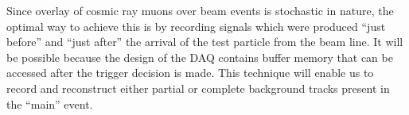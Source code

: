 
Since overlay of cosmic ray muons over beam events is stochastic in nature, the optimal way to achieve this is by recording signals which were produced ``just before'' and ``just after'' the arrival of the test particle from the beam line.  It will be possible because the design of the DAQ contains buffer memory that can be accessed after the trigger decision is made.  This technique will enable us to record and reconstruct either partial or complete background tracks present in the ``main'' event.






